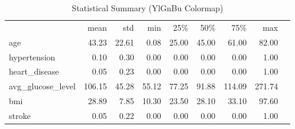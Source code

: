 \begin{table}
\caption{Statistical Summary (YlGnBu Colormap)}
\label{tab:stat_summary_ylgnbu}
\begin{tabular}{@{}lrrrrrrrr@{}}
 & mean & std & min & 25\% & 50\% & 75\% & max \\
age & \cellcolor[HTML]{6fc7bd} \color[HTML]{000000} 43.23 & \cellcolor[HTML]{42b6c4} \color[HTML]{f1f1f1} 22.61 & \cellcolor[HTML]{ffffd9} \color[HTML]{000000} 0.08 & \cellcolor[HTML]{9ed9b8} \color[HTML]{000000} 25.00 & \cellcolor[HTML]{46b8c3} \color[HTML]{f1f1f1} 45.00 & \cellcolor[HTML]{37acc3} \color[HTML]{f1f1f1} 61.00 & \cellcolor[HTML]{abdeb7} \color[HTML]{000000} 82.00 \\
hypertension & \cellcolor[HTML]{ffffd9} \color[HTML]{000000} 0.10 & \cellcolor[HTML]{ffffd9} \color[HTML]{000000} 0.30 & \cellcolor[HTML]{ffffd9} \color[HTML]{000000} 0.00 & \cellcolor[HTML]{ffffd9} \color[HTML]{000000} 0.00 & \cellcolor[HTML]{ffffd9} \color[HTML]{000000} 0.00 & \cellcolor[HTML]{ffffd9} \color[HTML]{000000} 0.00 & \cellcolor[HTML]{ffffd9} \color[HTML]{000000} 1.00 \\
heart_disease & \cellcolor[HTML]{ffffd9} \color[HTML]{000000} 0.05 & \cellcolor[HTML]{ffffd9} \color[HTML]{000000} 0.23 & \cellcolor[HTML]{ffffd9} \color[HTML]{000000} 0.00 & \cellcolor[HTML]{ffffd9} \color[HTML]{000000} 0.00 & \cellcolor[HTML]{ffffd9} \color[HTML]{000000} 0.00 & \cellcolor[HTML]{ffffd9} \color[HTML]{000000} 0.00 & \cellcolor[HTML]{ffffd9} \color[HTML]{000000} 1.00 \\
avg_glucose_level & \cellcolor[HTML]{081d58} \color[HTML]{f1f1f1} 106.15 & \cellcolor[HTML]{081d58} \color[HTML]{f1f1f1} 45.28 & \cellcolor[HTML]{081d58} \color[HTML]{f1f1f1} 55.12 & \cellcolor[HTML]{081d58} \color[HTML]{f1f1f1} 77.25 & \cellcolor[HTML]{081d58} \color[HTML]{f1f1f1} 91.88 & \cellcolor[HTML]{081d58} \color[HTML]{f1f1f1} 114.09 & \cellcolor[HTML]{081d58} \color[HTML]{f1f1f1} 271.74 \\
bmi & \cellcolor[HTML]{bbe4b5} \color[HTML]{000000} 28.89 & \cellcolor[HTML]{e0f3b2} \color[HTML]{000000} 7.85 & \cellcolor[HTML]{dbf1b2} \color[HTML]{000000} 10.30 & \cellcolor[HTML]{a9ddb7} \color[HTML]{000000} 23.50 & \cellcolor[HTML]{a7dcb7} \color[HTML]{000000} 28.10 & \cellcolor[HTML]{b0e0b6} \color[HTML]{000000} 33.10 & \cellcolor[HTML]{89d1ba} \color[HTML]{000000} 97.60 \\
stroke & \cellcolor[HTML]{ffffd9} \color[HTML]{000000} 0.05 & \cellcolor[HTML]{ffffd9} \color[HTML]{000000} 0.22 & \cellcolor[HTML]{ffffd9} \color[HTML]{000000} 0.00 & \cellcolor[HTML]{ffffd9} \color[HTML]{000000} 0.00 & \cellcolor[HTML]{ffffd9} \color[HTML]{000000} 0.00 & \cellcolor[HTML]{ffffd9} \color[HTML]{000000} 0.00 & \cellcolor[HTML]{ffffd9} \color[HTML]{000000} 1.00 \\
\end{tabular}
\end{table}
